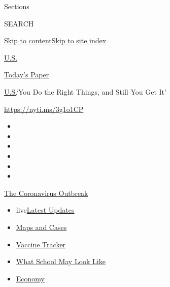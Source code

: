 Sections

SEARCH

\protect\hyperlink{site-content}{Skip to
content}\protect\hyperlink{site-index}{Skip to site index}

\href{https://www.nytimes.com/section/us}{U.S.}

\href{https://myaccount.nytimes.com/auth/login?response_type=cookie\&client_id=vi}{}

\href{https://www.nytimes.com/section/todayspaper}{Today's Paper}

\href{/section/us}{U.S.}\textbar{}`You Do the Right Things, and Still
You Get It'

\url{https://nyti.ms/3g1o1CP}

\begin{itemize}
\item
\item
\item
\item
\item
\item
\end{itemize}

\href{https://www.nytimes.com/news-event/coronavirus?action=click\&pgtype=Article\&state=default\&region=TOP_BANNER\&context=storylines_menu}{The
Coronavirus Outbreak}

\begin{itemize}
\tightlist
\item
  live\href{https://www.nytimes.com/2020/08/01/world/coronavirus-covid-19.html?action=click\&pgtype=Article\&state=default\&region=TOP_BANNER\&context=storylines_menu}{Latest
  Updates}
\item
  \href{https://www.nytimes.com/interactive/2020/us/coronavirus-us-cases.html?action=click\&pgtype=Article\&state=default\&region=TOP_BANNER\&context=storylines_menu}{Maps
  and Cases}
\item
  \href{https://www.nytimes.com/interactive/2020/science/coronavirus-vaccine-tracker.html?action=click\&pgtype=Article\&state=default\&region=TOP_BANNER\&context=storylines_menu}{Vaccine
  Tracker}
\item
  \href{https://www.nytimes.com/interactive/2020/07/29/us/schools-reopening-coronavirus.html?action=click\&pgtype=Article\&state=default\&region=TOP_BANNER\&context=storylines_menu}{What
  School May Look Like}
\item
  \href{https://www.nytimes.com/live/2020/07/31/business/stock-market-today-coronavirus?action=click\&pgtype=Article\&state=default\&region=TOP_BANNER\&context=storylines_menu}{Economy}
\end{itemize}

